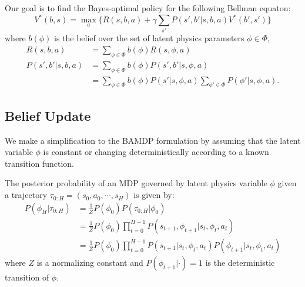 \documentclass{article}
\DeclareMathOperator*{\argmax}{arg\,max}
\begin{document}
Our goal is to find the Bayes-optimal policy for the following Bellman equaton:
\begin{equation}\label{eq:rl}
V^*(b, s) = \max_a \bigg\{R(s, b, a) + \gamma \sum_{s'}P(s', b'|s, b, a)V^*(b', s') \bigg\}
\end{equation}
where $b(\phi)$ is the belief over the set of latent physics parameters $\phi \in \Phi$,
\begin{align*}
R(s, b, a)
  &= \sum_{\phi \in \Phi} b(\phi) R(s, \phi, a) \\
P(s', b' | s, b, a)
  &= \sum_{\phi \in \Phi} b(\phi) P(s', b' | s, \phi, a) \\
  &= \sum_{\phi \in \Phi} b(\phi) P(s' | s, \phi, a) \sum_{\phi' \in \Phi} P(\phi' | s, \phi, a).
\end{align*}


\subsection{Belief Update}

We make a simplification to the BAMDP formulation by assuming that the latent variable $\phi$ is constant or changing deterministically according to a known transition function.


The posterior probability of an MDP governed by latent physics variable $\phi$ given a trajectory $\tau_{0:H} = (s_0, a_0, \cdots, s_H)$ is given by:
\begin{align}
P(\phi_H | \tau_{0:H})
  &= \frac{1}{Z} P(\phi_0) P(\tau_{0:H} | \phi_0) \nonumber \\
  &= \frac{1}{Z} P(\phi_0) \prod_{t=0}^{H-1} P(s_{t+1}, \phi_{t+1} | s_t, \phi_t, a_t) \nonumber \\
  &= \frac{1}{Z} P(\phi_0) \prod_{t=0}^{H-1} P(s_{t+1}|s_t, \phi_t, a_t) P(\phi_{t+1} | s_t, \phi_t, a_t)
\end{align}
where $Z$ is a normalizing constant and $P(\phi_{t+1} | \cdot) = 1$ is the deterministic transition of $\phi$.
\end{document}
